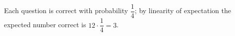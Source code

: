 Each question is correct with probability $\dfrac{1}{4}$; by linearity of expectation the expected number correct is $12\cdot\dfrac{1}{4}=\boxed{3}$.
